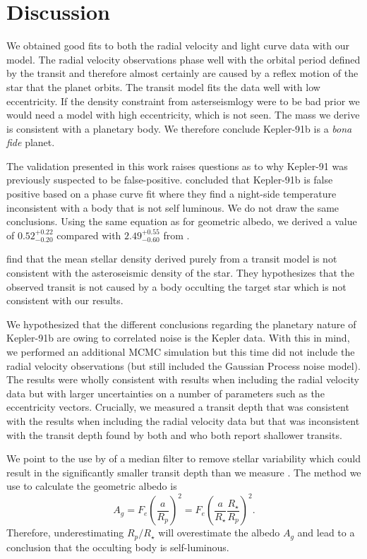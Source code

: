 \documentclass[apjl]{emulateapj}
\begin{document}
\section{Discussion}
We obtained good fits to both the radial velocity and light curve data with our model. The radial velocity observations phase well with the orbital period defined by the transit and therefore almost certainly are caused by a reflex motion of the star that the planet orbits. The transit model fits the data well with low eccentricity. If the density constraint from asterseismlogy were to be bad prior we would need a model with high eccentricity, which is not seen. The mass we derive is consistent with a planetary body. We therefore conclude Kepler-91b is a \emph{bona fide} planet.

The validation presented in this work raises questions as to why Kepler-91 was previously suspected to be false-positive. \citet{esteves13} concluded that Kepler-91b is false positive based on a phase curve fit where they find a night-side temperature inconsistent with a body that is not self luminous. We do not draw the same conclusions. Using the same equation as \citeauthor{esteves13} for geometric albedo, we derived a value of $0.52^{+0.22}_{-0.20}$ compared with $2.49^{+0.55}_{-0.60}$ from \citeauthor{esteves13}. 

\citet{sliski14} find that the mean stellar density derived purely from a transit model is not consistent with the asteroseismic density of the star. They hypothesizes that the observed transit is not caused by a body occulting the target star which is not consistent with our results.

We hypothesized that the different conclusions regarding the planetary nature of Kepler-91b are owing to correlated noise is the Kepler data. With this in mind, we performed an additional MCMC simulation but this time did not include the radial velocity observations (but still included the Gaussian Process noise model). The results were wholly consistent with results when including the radial velocity data but with larger uncertainties on a number of parameters such as the eccentricity vectors. Crucially, we measured a transit depth that was consistent with the results when including the radial velocity data but that was inconsistent with the transit depth found by both \citet{esteves13} and \citet{sliski14} who both report shallower transits. 

We point to the use by \citeauthor{esteves13} of a median filter to remove stellar variability which could result in the significantly smaller transit depth than we measure \citep{alapini09}. The method we use to calculate the geometric albedo is
\begin{equation}
A_g = F_e \left(\frac{a}{R_p}\right)^{2} = F_e \left(\frac{a}{R_{\star}}\frac{R_{\star}}{R_{p}}\right)^{2} .
\end{equation}
Therefore, underestimating $R_{p}/R_{\star}$ will overestimate the albedo $A_g$ and lead to a conclusion that the occulting body is self-luminous.
\end{document}
